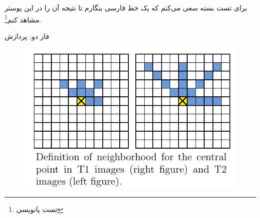 \documentclass[debug,a0paper,portrait]{xebaposter}
\begin{document}
\begin{poster}

\begin{posterbox}[name=introduction,column=0,row=0]{}
برای تست بسته سعی می‌کنم که یک خط فارسی بنگارم تا نتیجه آن را در این پوستر مشاهد کنم\footnote{تست پانویسی}.
\end{posterbox}
\begin{posterbox}[name=phase2,column=1,span=1]{فاز دو: پردازش}

\begin{figure}
\includegraphics[scale=.5]{fig3}
\end{figure}


\end{posterbox}
\end{poster}
\end{document}
